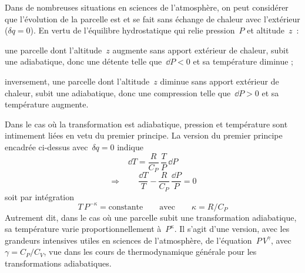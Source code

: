\sk
Dans de nombreuses situations en sciences de l'atmosphère, on peut considérer que l'évolution de la parcelle est  et se fait sans échange de chaleur avec l'extérieur ($\delta q=0$). En vertu de l'équilibre hydrostatique qui relie pression~$P$ et altitude~$z$~:
\begin{citemize}
\item une parcelle dont l'altitude~$z$ augmente sans apport extérieur de chaleur, subit une  adiabatique, donc une détente telle que~$\dd P < 0$ et sa température diminue ;
\item inversement, une parcelle dont l'altitude~$z$ diminue sans apport extérieur de chaleur, subit une  adiabatique, donc une compression telle que~$\dd P > 0$ et sa température augmente. 
\end{citemize}

\sk
Dans le cas où la transformation est adiabatique, pression et température sont intimement liées en vetu du premier principe. La version du premier principe encadrée ci-dessus avec~$\delta q = 0$ indique
\[ \dd T = \frac{R}{C_P} \, \frac{T}{P} \, \dd P\]
\[ \Rightarrow \qquad \frac{\dd T}{T} - \frac{R}{C_P} \, \frac{\dd P}{P} = 0 \]
soit par intégration
\[ T \, P^{- \kappa} = \text{constante} \qquad \text{avec} \qquad \kappa = R / C_P \]
Autrement dit, dans le cas où une parcelle subit une transformation adiabatique, sa température varie proportionnellement à~$P^{\kappa}$. Il s'agit d'une version, avec les grandeurs intensives utiles en sciences de l'atmosphère, de l'équation~$P\,V^{\gamma}$, avec $\gamma = C_P / C_V$, vue dans les cours de thermodynamique générale pour les transformations adiabatiques.


